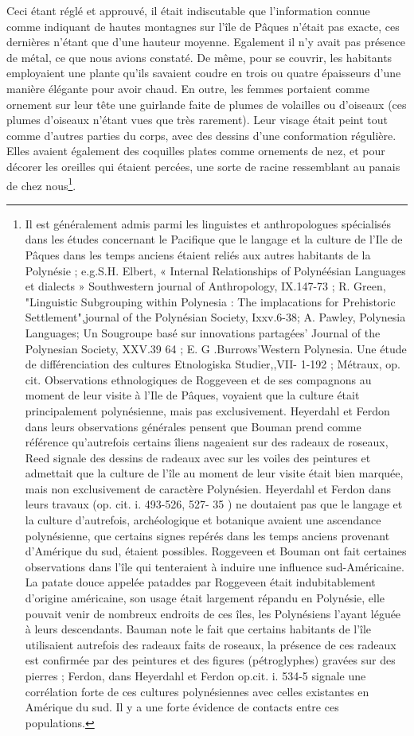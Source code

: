 \documentclass{article}
\begin{document}
        
    Ceci étant réglé et approuvé, il était indiscutable que l'information connue comme indiquant de hautes montagnes sur l'île de Pâques n'était pas exacte, ces dernières n'étant que d'une hauteur moyenne. Egalement il n'y avait pas présence de métal, ce que nous avions constaté. De même, pour se couvrir, les habitants employaient une plante qu'ils savaient coudre en trois ou quatre épaisseurs d'une manière élégante pour avoir chaud. En outre, les femmes portaient comme ornement sur leur tête une guirlande faite de plumes de volailles ou d'oiseaux (ces plumes d'oiseaux n'étant vues que très rarement). Leur visage était peint tout comme d'autres parties du corps, avec des dessins d'une conformation régulière. Elles avaient également des coquilles plates comme ornements de nez, et pour décorer les oreilles qui étaient percées, une sorte de racine ressemblant au panais de chez nous\footnote{Il est généralement admis parmi les linguistes et anthropologues spécialisés dans les études concernant le Pacifique que le langage et la culture de l'Ile de Pâques dans les temps anciens étaient reliés aux autres habitants de la Polynésie ; e.g.S.H. Elbert, « Internal Relationships of Polynéésian Languages et dialects » Southwestern journal of Anthropology, IX.147-73 ; R. Green, "Linguistic Subgrouping within Polynesia : The implacations for Prehistoric Settlement",journal of the Polynésian Society, Ixxv.6-38; A. Pawley, Polynesia Languages; Un Sougroupe basé sur innovations partagées' Journal of the Polynesian Society, XXV.39 64 ; E. G .Burrows'Western Polynesia. Une étude de différenciation des cultures Etnologiska Studier,,VII- 1-192 ; Métraux, op. cit. Observations ethnologiques de Roggeveen et de ses compagnons au moment de leur visite à l'Ile de Pâques, voyaient que la culture était principalement polynésienne, mais pas exclusivement. Heyerdahl et Ferdon dans leurs observations générales pensent que Bouman prend comme référence qu'autrefois certains îliens nageaient sur des radeaux de roseaux, Reed signale des dessins de radeaux avec sur les voiles des peintures et admettait que la culture de l'île au moment de leur visite était bien marquée, mais non exclusivement de caractère Polynésien. Heyerdahl et Ferdon dans leurs travaux (op. cit. i. 493-526, 527- 35 ) ne doutaient pas que le langage et la culture d'autrefois, archéologique et botanique avaient une ascendance polynésienne, que certains signes repérés dans les temps anciens provenant d'Amérique du sud, étaient possibles. Roggeveen et Bouman ont fait certaines observations dans l'île qui tenteraient à induire une influence sud-Américaine. La patate douce appelée pataddes par Roggeveen était indubitablement d'origine américaine, son usage était largement répandu en Polynésie, elle pouvait venir de nombreux endroits de ces îles, les Polynésiens l'ayant léguée à leurs descendants. Bauman note le fait que certains habitants de l'île utilisaient autrefois des radeaux faits de roseaux, la présence de ces radeaux est confirmée par des peintures et des figures (pétroglyphes) gravées sur des pierres ; Ferdon, dans Heyerdahl et Ferdon op.cit. i. 534-5 signale une corrélation forte de ces cultures polynésiennes avec celles existantes en Amérique du sud. Il y a une forte évidence de contacts entre ces populations.}.
            
\end{document}
